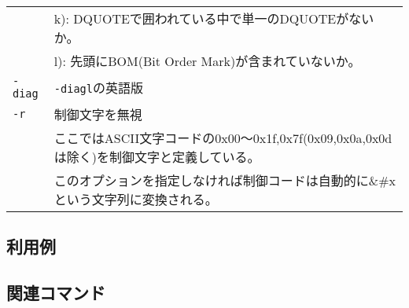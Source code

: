 \begin{table}[htbp]
{\begin{tabular}{ll}
             & k): DQUOTEで囲われている中で単一のDQUOTEがないか。\\
             & l): 先頭にBOM(Bit Order Mark)が含まれていないか。\\
\verb|-diag| & \verb|-diagl|の英語版\\
\verb|-r|    & 制御文字を無視\\
             & ここではASCII文字コードの0x00〜0x1f,0x7f(0x09,0x0a,0x0dは除く)を制御文字と定義している。\\
             & このオプションを指定しなければ制御コードは自動的に\&\#xという文字列に変換される。\\
\end{tabular} 
}
\end{table} 

\subsection*{利用例}


\subsection*{関連コマンド}

%
